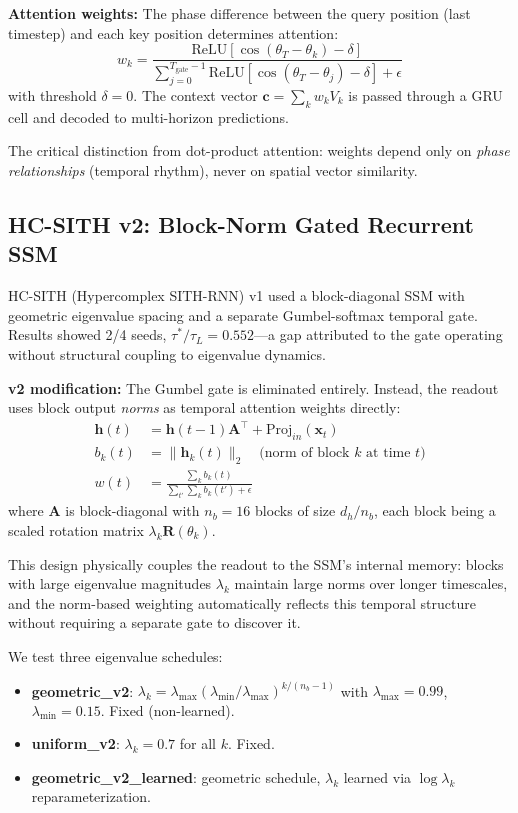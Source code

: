 \documentclass[12pt]{article}
\theoremstyle{definition}
\begin{document}
\textbf{Attention weights:} The phase difference between the query position (last
timestep) and each key position determines attention:
\begin{equation}
  w_k = \frac{\text{ReLU}\!\left[\cos(\theta_T - \theta_k) - \delta\right]}
             {\sum_{j=0}^{T_{\text{gate}}-1} \text{ReLU}\!\left[\cos(\theta_T - \theta_j) - \delta\right] + \epsilon}
\end{equation}
with threshold $\delta = 0$. The context vector $\mathbf{c} = \sum_k w_k V_k$ is
passed through a GRU cell and decoded to multi-horizon predictions.

The critical distinction from dot-product attention: weights depend only on
\emph{phase relationships} (temporal rhythm), never on spatial vector similarity.

\subsection{HC-SITH v2: Block-Norm Gated Recurrent SSM}

HC-SITH (Hypercomplex SITH-RNN) v1 \citep{archon2026e} used a block-diagonal
SSM with geometric eigenvalue spacing and a separate Gumbel-softmax temporal gate.
Results showed 2/4 seeds, $\tau^*/\tau_L = 0.552$---a gap attributed to the gate
operating without structural coupling to eigenvalue dynamics.

\textbf{v2 modification:} The Gumbel gate is eliminated entirely. Instead, the
readout uses block output \emph{norms} as temporal attention weights directly:
\begin{align}
  \mathbf{h}(t) &= \mathbf{h}(t-1)\mathbf{A}^{\top} + \text{Proj}_{in}(\mathbf{x}_t) \\
  b_k(t) &= \|\mathbf{h}_k(t)\|_2 \quad \text{(norm of block } k \text{ at time } t\text{)} \\
  w(t) &= \frac{\sum_k b_k(t)}{\sum_{t'}\sum_k b_k(t') + \epsilon}
\end{align}
where $\mathbf{A}$ is block-diagonal with $n_b = 16$ blocks of size $d_h/n_b$,
each block being a scaled rotation matrix $\lambda_k \mathbf{R}(\theta_k)$.

This design physically couples the readout to the SSM's internal memory: blocks
with large eigenvalue magnitudes $\lambda_k$ maintain large norms over longer
timescales, and the norm-based weighting automatically reflects this temporal
structure without requiring a separate gate to discover it.

We test three eigenvalue schedules:
\begin{itemize}
  \item \textbf{geometric\_v2}: $\lambda_k = \lambda_{\max}\left(\lambda_{\min}/\lambda_{\max}\right)^{k/(n_b-1)}$
    with $\lambda_{\max}=0.99$, $\lambda_{\min}=0.15$. Fixed (non-learned).
  \item \textbf{uniform\_v2}: $\lambda_k = 0.7$ for all $k$. Fixed.
  \item \textbf{geometric\_v2\_learned}: geometric schedule, $\lambda_k$ learned
    via $\log\lambda_k$ reparameterization.
\end{itemize}
\end{document}
